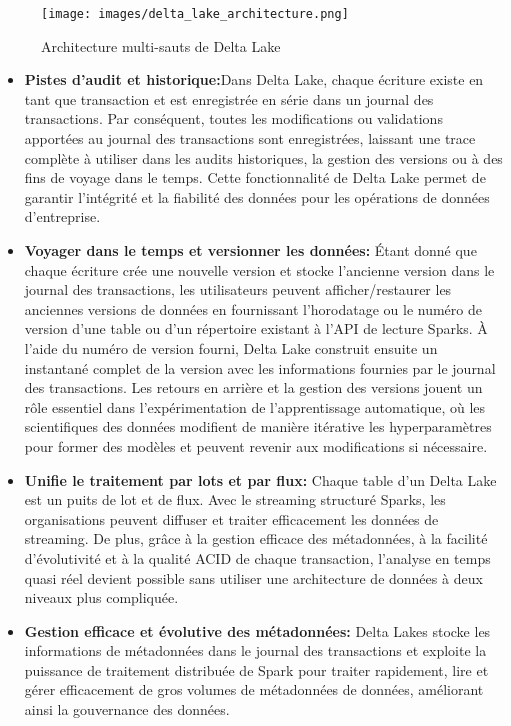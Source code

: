 \begin{figure}[H]
\centering
\texttt{[image: images/delta\_lake\_architecture.png]}
\caption{Architecture multi-sauts de Delta Lake}\label{fig:delta-lake-architecture}
\end{figure}

\begin{itemize}
	\item[\textbullet] \textbf{Pistes d'audit et historique:}Dans Delta Lake, chaque écriture existe en tant que transaction et est enregistrée en série dans un journal des transactions. Par conséquent, toutes les modifications ou validations apportées au journal des transactions sont enregistrées, laissant une trace complète à utiliser dans les audits historiques, la gestion des versions ou à des fins de voyage dans le temps. Cette fonctionnalité de Delta Lake permet de garantir l'intégrité et la fiabilité des données pour les opérations de données d'entreprise.
	\item[\textbullet] \textbf{Voyager dans le temps et versionner les données:} Étant donné que chaque écriture crée une nouvelle version et stocke l'ancienne version dans le journal des transactions, les utilisateurs peuvent afficher/restaurer les anciennes versions de données en fournissant l'horodatage ou le numéro de version d'une table ou d'un répertoire existant à l'API de lecture Sparks\@. À l'aide du numéro de version fourni, Delta Lake construit ensuite un instantané complet de la version avec les informations fournies par le journal des transactions. Les retours en arrière et la gestion des versions jouent un rôle essentiel dans l'expérimentation de l'apprentissage automatique, où les scientifiques des données modifient de manière itérative les hyperparamètres pour former des modèles et peuvent revenir aux modifications si nécessaire.
	\item[\textbullet] \textbf{Unifie le traitement par lots et par flux:} Chaque table d'un Delta Lake est un puits de lot et de flux. Avec le streaming structuré Sparks, les organisations peuvent diffuser et traiter efficacement les données de streaming. De plus, grâce à la gestion efficace des métadonnées, à la facilité d'évolutivité et à la qualité ACID de chaque transaction, l'analyse en temps quasi réel devient possible sans utiliser une architecture de données à deux niveaux plus compliquée.
	\item[\textbullet] \textbf{Gestion efficace et évolutive des métadonnées:} Delta Lakes stocke les informations de métadonnées dans le journal des transactions et exploite la puissance de traitement distribuée de Spark pour traiter rapidement, lire et gérer efficacement de gros volumes de métadonnées de données, améliorant ainsi la gouvernance des données.

\end{itemize}
